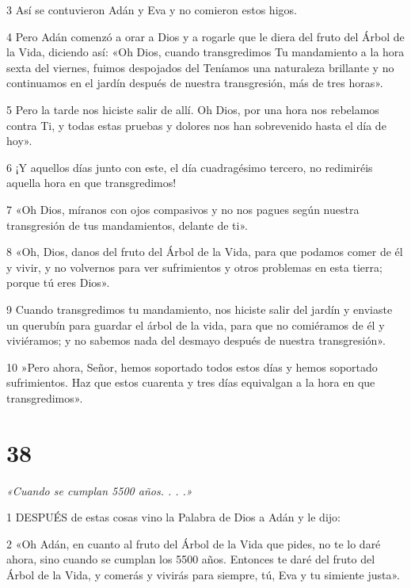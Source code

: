 \par 3 Así se contuvieron Adán y Eva y no comieron estos higos.

\par 4 Pero Adán comenzó a orar a Dios y a rogarle que le diera del fruto del Árbol de la Vida, diciendo así: «Oh Dios, cuando transgredimos Tu mandamiento a la hora sexta del viernes, fuimos despojados del Teníamos una naturaleza brillante y no continuamos en el jardín después de nuestra transgresión, más de tres horas».

\par 5 Pero la tarde nos hiciste salir de allí. Oh Dios, por una hora nos rebelamos contra Ti, y todas estas pruebas y dolores nos han sobrevenido hasta el día de hoy».

\par 6 ¡Y aquellos días junto con este, el día cuadragésimo tercero, no redimiréis aquella hora en que transgredimos!

\par 7 «Oh Dios, míranos con ojos compasivos y no nos pagues según nuestra transgresión de tus mandamientos, delante de ti».

\par 8 «Oh, Dios, danos del fruto del Árbol de la Vida, para que podamos comer de él y vivir, y no volvernos para ver sufrimientos y otros problemas en esta tierra; porque tú eres Dios».

\par 9 Cuando transgredimos tu mandamiento, nos hiciste salir del jardín y enviaste un querubín para guardar el árbol de la vida, para que no comiéramos de él y viviéramos; y no sabemos nada del desmayo después de nuestra transgresión».

\par 10 »Pero ahora, Señor, hemos soportado todos estos días y hemos soportado sufrimientos. Haz que estos cuarenta y tres días equivalgan a la hora en que transgredimos».

\chapter{38}

\par \textit{«Cuando se cumplan 5500 años. . . .»}

\par 1 DESPUÉS de estas cosas vino la Palabra de Dios a Adán y le dijo:

\par 2 «Oh Adán, en cuanto al fruto del Árbol de la Vida que pides, no te lo daré ahora, sino cuando se cumplan los 5500 años. Entonces te daré del fruto del Árbol de la Vida, y comerás y vivirás para siempre, tú, Eva y tu simiente justa».

